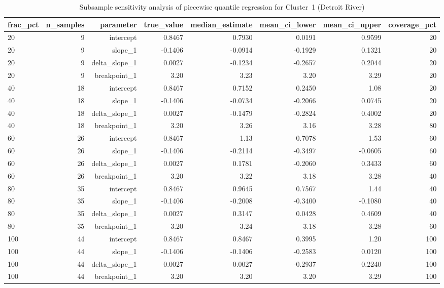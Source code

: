 \begin{table}[htbp]
  \centering
  \caption{Subsample sensitivity analysis of piecewise quantile regression for Cluster~1 (Detroit River)}
  \label{tab:dr_05_piecewise_qr_sensitivity_cluster_1}
  \small
  \begin{tabular}{lrrrrrrr}
    \toprule
    frac\_pct & n\_samples & parameter & true\_value & median\_estimate & mean\_ci\_lower & mean\_ci\_upper & coverage\_pct \\
    \midrule
    20 & 9 & intercept & 0.8467 & 0.7930 & 0.0191 & 0.9599 & 20 \\
    20 & 9 & slope\_1 & -0.1406 & -0.0914 & -0.1929 & 0.1321 & 20 \\
    20 & 9 & delta\_slope\_1 & 0.0027 & -0.1234 & -0.2657 & 0.2044 & 20 \\
    20 & 9 & breakpoint\_1 & 3.20 & 3.23 & 3.20 & 3.29 & 20 \\
    40 & 18 & intercept & 0.8467 & 0.7152 & 0.2450 & 1.08 & 20 \\
    40 & 18 & slope\_1 & -0.1406 & -0.0734 & -0.2066 & 0.0745 & 20 \\
    40 & 18 & delta\_slope\_1 & 0.0027 & -0.1479 & -0.2824 & 0.4002 & 20 \\
    40 & 18 & breakpoint\_1 & 3.20 & 3.26 & 3.16 & 3.28 & 80 \\
    60 & 26 & intercept & 0.8467 & 1.13 & 0.7078 & 1.53 & 60 \\
    60 & 26 & slope\_1 & -0.1406 & -0.2114 & -0.3497 & -0.0605 & 60 \\
    60 & 26 & delta\_slope\_1 & 0.0027 & 0.1781 & -0.2060 & 0.3433 & 60 \\
    60 & 26 & breakpoint\_1 & 3.20 & 3.22 & 3.18 & 3.28 & 40 \\
    80 & 35 & intercept & 0.8467 & 0.9645 & 0.7567 & 1.44 & 40 \\
    80 & 35 & slope\_1 & -0.1406 & -0.2008 & -0.3400 & -0.1080 & 40 \\
    80 & 35 & delta\_slope\_1 & 0.0027 & 0.3147 & 0.0428 & 0.4609 & 40 \\
    80 & 35 & breakpoint\_1 & 3.20 & 3.24 & 3.18 & 3.28 & 60 \\
    100 & 44 & intercept & 0.8467 & 0.8467 & 0.3995 & 1.20 & 100 \\
    100 & 44 & slope\_1 & -0.1406 & -0.1406 & -0.2583 & 0.0120 & 100 \\
    100 & 44 & delta\_slope\_1 & 0.0027 & 0.0027 & -0.2937 & 0.2240 & 100 \\
    100 & 44 & breakpoint\_1 & 3.20 & 3.20 & 3.20 & 3.29 & 100 \\
    \bottomrule
  \end{tabular}
\end{table}

